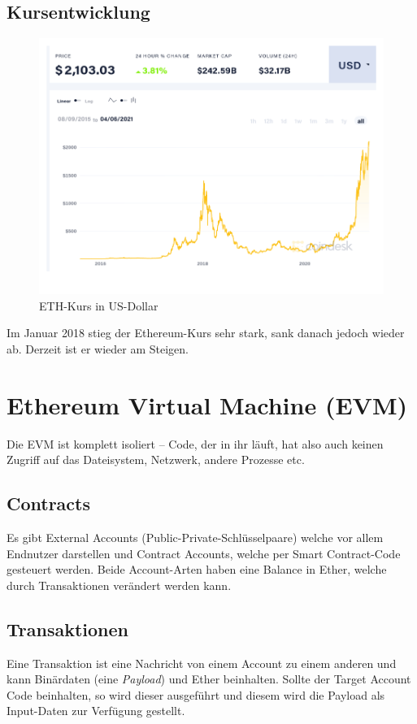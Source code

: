 \subsection{Kursentwicklung}
\begin{figure}[H]
    \centering
    \includegraphics[width=0.7\linewidth]{images/eth-kurs.png}
    \caption{ETH-Kurs in US-Dollar}
\end{figure}

Im Januar 2018 stieg der Ethereum-Kurs sehr stark, sank danach jedoch wieder ab. Derzeit ist er wieder am Steigen.

\section{Ethereum Virtual Machine (EVM)}\label{l_evm}
Die EVM ist komplett isoliert -- Code, der in ihr läuft, hat also auch keinen Zugriff auf das Dateisystem, Netzwerk, andere Prozesse etc.

\subsection{Contracts}
Es gibt External Accounts (Public-Private-Schlüsselpaare) welche vor allem Endnutzer darstellen und Contract Accounts, welche per Smart Contract-Code gesteuert werden. Beide Account-Arten haben eine Balance in Ether, welche durch Transaktionen verändert werden kann.

\subsection{Transaktionen}
Eine Transaktion ist eine Nachricht von einem Account zu einem anderen und kann Binärdaten (eine \textit{Payload}) und Ether beinhalten. Sollte der Target Account Code beinhalten, so wird dieser ausgeführt und diesem wird die Payload als Input-Daten zur Verfügung gestellt.

